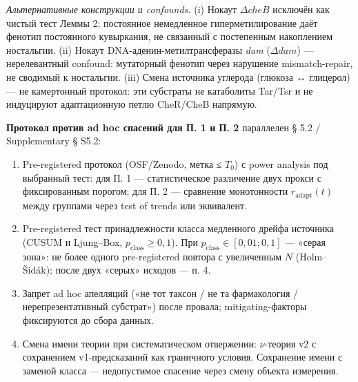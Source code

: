 \documentclass[pdflatex,sn-mathphys-ay]{sn-jnl}
\providecommand{\tightlist}{\setlength{\itemsep}{0pt}\setlength{\parskip}{0pt}}
\begin{document}
\emph{Альтернативные конструкции и confounds.} (i) Нокаут \(\Delta cheB\) исключён как чистый тест Леммы 2: постоянное немедленное гиперметилирование даёт фенотип постоянного кувыркания, не связанный с постепенным накоплением ностальгии. (ii) Нокаут DNA-аденин-метилтрансферазы \emph{dam} (\(\Delta dam\)) --- нерелевантный confound: мутаторный фенотип через нарушение mismatch-repair, не сводимый к ностальгии. (iii) Смена источника углерода (глюкоза ↔ глицерол) --- не камертонный протокол: эти субстраты не катаболиты Tar/Tsr и не индуцируют адаптационную петлю CheR/CheB напрямую.



\textbf{Протокол против ad hoc спасений для П. 1 и П. 2} параллелен § 5.2 / Supplementary § S5.2:



\begin{enumerate}

\def\labelenumi{\arabic{enumi}.}

\tightlist

\item

  Pre-registered протокол (OSF/Zenodo, метка ≤ \(T_0\)) с power analysis под выбранный тест: для П. 1 --- статистическое различение двух прокси с фиксированным порогом; для П. 2 --- сравнение монотонности \(r_{\text{adapt}}(t)\) между группами через test of trends или эквивалент.

\item

  Pre-registered тест принадлежности класса медленного дрейфа источника (CUSUM и Ljung--Box, \(p_{\text{class}} \ge 0{,}1\)). При \(p_{\text{class}} \in [0{,}01; 0{,}1]\) --- «серая зона»: не более одного pre-registered повтора с увеличенным \(N\) (Holm--Šidák); после двух «серых» исходов --- п. 4.

\item

  Запрет ad hoc апелляций («не тот таксон / не та фармакология / нерепрезентативный субстрат») после провала; mitigating-факторы фиксируются до сбора данных.

\item

  Смена имени теории при систематическом отвержении: \(\nu\)-теория v2 с сохранением v1-предсказаний как граничного условия. Сохранение имени с заменой класса --- недопустимое спасение через смену объекта измерения.

\end{enumerate}
\end{document}
